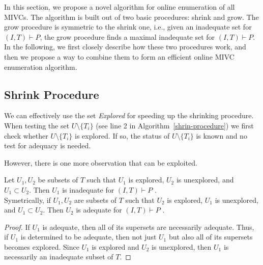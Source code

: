 In this section, we propose a novel algorithm for online enumeration of all MIVCs. The algorithm is built out of two basic procedures: shrink and grow. The grow procedure is symmetric to the shrink one, i.e., given an inadequate set for $(I, T) \vdash P$, the grow procedure finds a maximal inadequate set for $(I, T) \vdash P$. In the following, we first closely describe how these two procedures work, and then we propose a way to combine them to form an efficient online MIVC enumeration algorithm. 


\subsection{Shrink Procedure}

We can effectively use the set  \textit{Explored} for speeding up the shrinking procedure. When testing the set $U \setminus \{T_i\}$ (see line 2 in Algorithm~\ref{shrin-procedure}) we first check whether  $U \setminus \{T_i\}$ is explored. If so, the status of  $U \setminus \{T_i\}$ is known and no test for adequacy is needed.

However, there is one more observation that can be exploited.


\begin{observation}
\label{observation:explored-property}
Let $U_1, U_2$ be subsets of $T$ such that $U_1$ is explored, $U_2$ is unexplored, and $U_1 \subset U_2$. Then $U_1$ is inadequate  for $(I, T) \vdash P$ .\\
Symetrically, if $U_1, U_2$ are subsets of $T$ such that $U_2$ is explored, $U_1$ is unexplored, and $U_1 \subset U_2$. Then $U_2$ is adequate  for $(I, T) \vdash P$ .
\end{observation}

\begin{proof}
If $U_1$ is adequate, then all of its supersets are necessarily adequate. Thus, if $U_1$ is determined to be adequate, then not just $U_1$ but also all of its supersets becomes explored. Since $U_1$ is explored and $U_2$ is unexplored, then $U_1$ is necessarily an inadequate subset of $T$.
\end{proof}

